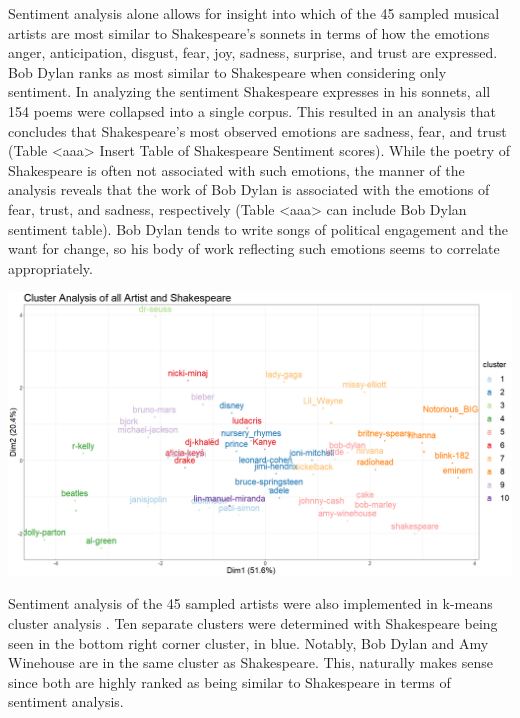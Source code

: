 \documentclass[11pt]{article}
\begin{document}
  

\noindent Sentiment analysis alone allows for insight into which of the 45 sampled musical artists are most similar to Shakespeare’s sonnets in terms of how the emotions anger, anticipation, disgust, fear, joy, sadness, surprise, and trust are expressed. Bob Dylan ranks as most similar to Shakespeare when considering only sentiment. In analyzing the sentiment Shakespeare expresses in his sonnets, all 154 poems were collapsed into a single corpus. This resulted in an analysis that concludes that Shakespeare’s most observed emotions are sadness, fear, and trust (Table <aaa> Insert Table of Shakespeare Sentiment scores). While the poetry of Shakespeare is often not associated with such emotions, the manner of the analysis reveals that the work of Bob Dylan is associated with the emotions of fear, trust, and sadness, respectively (Table <aaa> can include Bob Dylan sentiment table). Bob Dylan tends to write songs of political engagement and the want for change, so his body of work reflecting such emotions seems to correlate appropriately. 

\begin{center}
\includegraphics[width=14cm]{_assets/ClusterAnalysis_Fit10.png}
\end{center}

\noindent Sentiment analysis of the 45 sampled artists were also implemented in k-means cluster analysis . Ten separate clusters were determined with Shakespeare being seen in the bottom right corner cluster, in blue. Notably, Bob Dylan and Amy Winehouse are in the same cluster as Shakespeare. This, naturally makes sense since both are highly ranked as being similar to Shakespeare in terms of sentiment analysis. 
\end{document}

